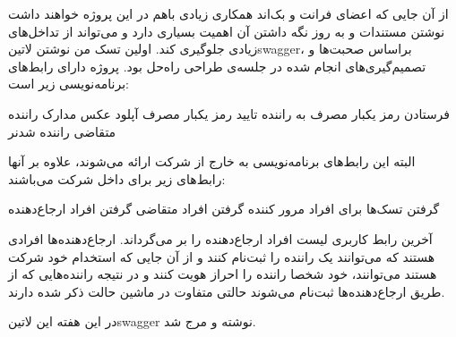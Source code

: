 \documentclass[a4]{report}
\begin{document}
از آن جایی که اعضای فرانت و بک‌اند همکاری زیادی باهم در این پروژه خواهند داشت نوشتن مستندات و به روز نگه داشتن آن اهمیت بسیاری دارد
و می‌تواند از تداخل‌های زیادی جلوگیری کند. اولین تسک من نوشتن ‌لاتین{swagger}، براساس صحبت‌ها و تصمیم‌گیری‌های انجام شده در جلسه‌ی طراحی راه‌حل بود.
پروژه دارای رابط‌های برنامه‌نویسی زیر است:

 فرستادن رمز یکبار مصرف به راننده
 تایید رمز یکبار مصرف
 آپلود عکس مدارک راننده
 متقاضی راننده شدنر

البته این رابط‌های برنامه‌نویسی به خارج از شرکت ارائه می‌شوند، علاوه بر آنها رابط‌های زیر برای داخل شرکت می‌باشند:

 گرفتن تسک‌ها برای افراد مرور کننده
 گرفتن افراد متقاضی
 گرفتن افراد ارجاع‌دهنده

آخرین رابط کاربری لیست افراد ارجاع‌دهنده را بر می‌گرداند. ارجاع‌دهنده‌ها افرادی هستند که می‌توانند یک راننده را ثبت‌نام کنند و از آن جایی که استخدام خود شرکت هستند
می‌توانند، خود شخصا راننده را احراز هویت کنند و در نتیجه راننده‌هایی که از طریق ارجاع‌دهنده‌ها ثبت‌نام می‌شوند حالتی متفاوت در ماشین حالت ذکر شده دارند.

در این هفته این ‌لاتین{swagger} نوشته و مرج شد.
\end{document}
